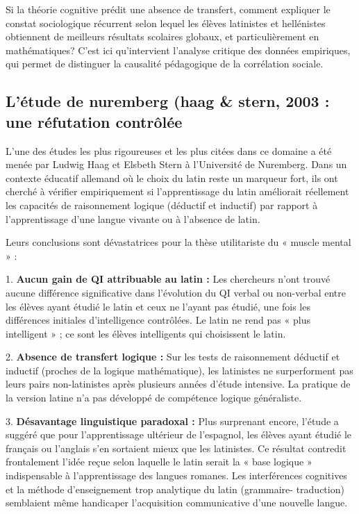 Si la théorie cognitive prédit une absence de transfert, comment expliquer le constat sociologique
récurrent selon lequel les élèves latinistes et hellénistes obtiennent de meilleurs résultats
scolaires globaux, et particulièrement en mathématiques? C'est ici qu'intervient l'analyse critique
des données empiriques, qui permet de distinguer la causalité pédagogique de la corrélation sociale.



\subsection{L'étude de nuremberg (haag \& stern, 2003\) : une réfutation contrôlée}

L'une des études les plus rigoureuses et les plus citées dans ce domaine a été menée par Ludwig Haag
et Elsbeth Stern à l'Université de Nuremberg. Dans un contexte éducatif allemand où le choix du
latin reste un marqueur fort, ils ont cherché à vérifier empiriquement si l'apprentissage du latin
améliorait réellement les capacités de raisonnement logique (déductif et inductif) par rapport à
l'apprentissage d'une langue vivante ou à l'absence de latin.\cite{II-1-2-ref16}

Leurs conclusions sont dévastatrices pour la thèse utilitariste du « muscle mental » :

1. \textbf{Aucun gain de QI attribuable au latin :} Les chercheurs n'ont trouvé aucune différence
significative dans l'évolution du QI verbal ou non-verbal entre les élèves ayant étudié le latin et
ceux ne l'ayant pas étudié, une fois les différences initiales d'intelligence contrôlées. Le latin
ne rend pas « plus intelligent » ; ce sont les élèves intelligents qui choisissent le
latin.\cite{II-1-2-ref22}

2. \textbf{Absence de transfert logique :} Sur les tests de raisonnement déductif et inductif
(proches de la logique mathématique), les latinistes ne surperforment pas leurs pairs non-latinistes
après plusieurs années d'étude intensive. La pratique de la version latine n'a pas développé de
compétence logique généraliste.\cite{II-1-2-ref16}

3. \textbf{Désavantage linguistique paradoxal :} Plus surprenant encore, l'étude a suggéré que pour
l'apprentissage ultérieur de l'espagnol, les élèves ayant étudié le français ou l'anglais s'en
sortaient mieux que les latinistes. Ce résultat contredit frontalement l'idée reçue selon laquelle
le latin serait la « base logique » indispensable à l'apprentissage des langues romanes. Les
interférences cognitives et la méthode d'enseignement trop analytique du latin (grammaire-
traduction) semblaient même handicaper l'acquisition communicative d'une nouvelle
langue.\cite{II-1-2-ref33}

